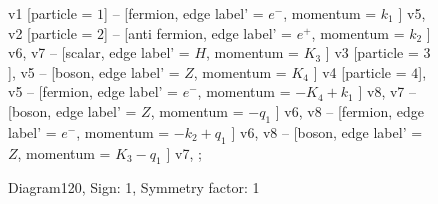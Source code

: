 \documentclass{revtex4}
\begin{document}
\begin{figure}[!htb]
\begin{center}
{    %
v1 [particle = \(1\)] -- [fermion, edge label' = \(e^{-}\), momentum = \(k_{1}\) ] v5, 
v2 [particle = \(2\)] -- [anti fermion, edge label' = \(e^{+}\), momentum = \(k_{2}\) ] v6, 
v7 -- [scalar, edge label' = \(H\), momentum = \(K_{3}\) ] v3 [particle = \(3\)], 
v5 -- [boson, edge label' = \(Z\), momentum = \(K_{4}\) ] v4 [particle = \(4\)], 
v5 -- [fermion, edge label' = \(e^{-}\), momentum = \(-K_{4} + k_{1}\) ] v8, 
v7 -- [boson, edge label' = \(Z\), momentum = \(-q_{1}\) ] v6, 
v8 -- [fermion, edge label' = \(e^{-}\), momentum = \(-k_{2} + q_{1}\) ] v6, 
v8 -- [boson, edge label' = \(Z\), momentum = \(K_{3} - q_{1}\) ] v7, 
};
\end{center}
\caption{Diagram120, Sign: 1, Symmetry factor: 1}
\end{figure}
\newpage
\end{document}
